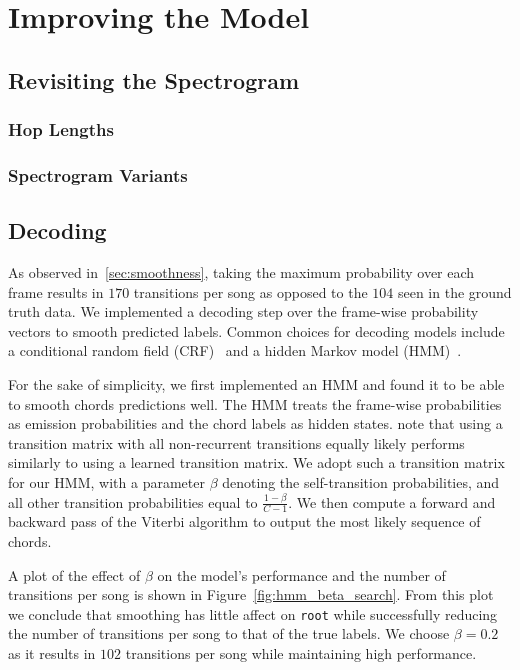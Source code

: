 \chapter{Improving the Model}\label{chap:model_improvements}

\section{Revisiting the Spectrogram}\label{sec:spectrogram-results}
\subsection{Hop Lengths}\label{sec:hop-lengths}
\subsection{Spectrogram Variants}\label{sec:spectrogram-variants}

\section{Decoding}\label{sec:decoding}

As observed in~\ref{sec:smoothness}, taking the maximum probability over each frame results in $170$ transitions per song as opposed to the $104$ seen in the ground truth data. We implemented a decoding step over the frame-wise probability vectors to smooth predicted labels. Common choices for decoding models include a conditional random field (CRF)~\citep{ACRLargeVocab1, BTC} and a hidden Markov model (HMM)~\citep{BalanceRandomForestACR}. 

For the sake of simplicity, we first implemented an HMM and found it to be able to smooth chords predictions well. The HMM treats the frame-wise probabilities as emission probabilities and the chord labels as hidden states. \citet{CQTvsChroma} note that using a transition matrix with all non-recurrent transitions equally likely performs similarly to using a learned transition matrix. We adopt such a transition matrix for our HMM, with a parameter $\beta$ denoting the self-transition probabilities, and all other transition probabilities equal to $\frac{1-\beta}{C-1}$. We then compute a forward and backward pass of the Viterbi algorithm to output the most likely sequence of chords.

A plot of the effect of $\beta$ on the model's performance and the number of transitions per song is shown in Figure~\ref{fig:hmm_beta_search}. From this plot we conclude that smoothing has little affect on \texttt{root} while successfully reducing the number of transitions per song to that of the true labels. We choose $\beta = 0.2$ as it results in $102$ transitions per song while maintaining high performance.

